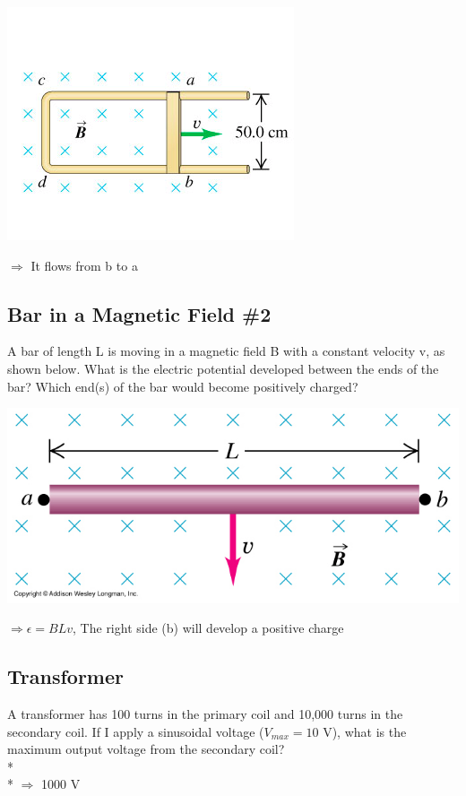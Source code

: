 \documentclass[11pt]{article}
\begin{document}
\begin{center}
\includegraphics[scale=0.5]{Images/bar_and_rails.png}
\end{center}

$\Rightarrow$ It flows from b to a

\subsection{Bar in a Magnetic Field \#2}
A bar of length L is moving in a magnetic field B with a constant velocity v, as shown below.  What is the electric potential developed between the ends of the bar?  Which end(s) of the bar would become positively charged?

\begin{center}
\includegraphics[scale=0.25]{Images/bar_in_magnetic_field.png}
\end{center}

$\Rightarrow \epsilon = BLv$, The right side (b) will develop a positive charge

\subsection{Transformer}
A transformer has 100 turns in the primary coil and 10,000 turns in the secondary coil.  If I apply a sinusoidal voltage ($V_{max} = 10$ V), what is the maximum output voltage from the secondary coil? \\* \\*
$\Rightarrow$ 1000 V
\end{document}
